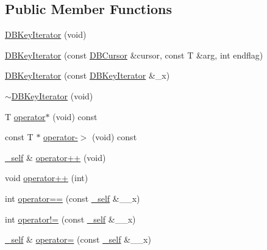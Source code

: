 \subsection*{Public Member Functions}
\begin{DoxyCompactItemize}
\item 
\mbox{\hyperlink{classFILEDB_1_1DBKeyIterator_aece085c0a59d87759e01613b5c64ef36}{D\+B\+Key\+Iterator}} (void)
\item 
\mbox{\hyperlink{classFILEDB_1_1DBKeyIterator_a7dc82bdde4a77bcadd704a3e87f6534a}{D\+B\+Key\+Iterator}} (const \mbox{\hyperlink{classFILEDB_1_1DBCursor}{D\+B\+Cursor}} \&cursor, const T \&arg, int endflag)
\item 
\mbox{\hyperlink{classFILEDB_1_1DBKeyIterator_ac1fa531110379c3deb566758095e8a0e}{D\+B\+Key\+Iterator}} (const \mbox{\hyperlink{classFILEDB_1_1DBKeyIterator}{D\+B\+Key\+Iterator}} \&\+\_\+x)
\item 
\mbox{\hyperlink{classFILEDB_1_1DBKeyIterator_a54300ef8000ed2910c47d931ee091113}{$\sim$\+D\+B\+Key\+Iterator}} (void)
\item 
T \mbox{\hyperlink{classFILEDB_1_1DBKeyIterator_ab3cfba3f2b19b6eb74ff614c62195ab4}{operator$\ast$}} (void) const
\item 
const T $\ast$ \mbox{\hyperlink{classFILEDB_1_1DBKeyIterator_a453e5281ba078f217558d44c049c564c}{operator-\/$>$}} (void) const
\item 
\mbox{\hyperlink{classFILEDB_1_1DBKeyIterator_aaf7773c7a848ec6e04bc738dd794ace1}{\+\_\+self}} \& \mbox{\hyperlink{classFILEDB_1_1DBKeyIterator_a7816155cac741f3f82dafa73028f4307}{operator++}} (void)
\item 
void \mbox{\hyperlink{classFILEDB_1_1DBKeyIterator_a364ac0414da6888e0b981f07b3239257}{operator++}} (int)
\item 
int \mbox{\hyperlink{classFILEDB_1_1DBKeyIterator_ab6d1aad1d07c4ee9a1edeadf6610c6f4}{operator==}} (const \mbox{\hyperlink{classFILEDB_1_1DBKeyIterator_aaf7773c7a848ec6e04bc738dd794ace1}{\+\_\+self}} \&\+\_\+\+\_\+x)
\item 
int \mbox{\hyperlink{classFILEDB_1_1DBKeyIterator_aa92d51bde395e8c546d9cbe1c65ef5e1}{operator!=}} (const \mbox{\hyperlink{classFILEDB_1_1DBKeyIterator_aaf7773c7a848ec6e04bc738dd794ace1}{\+\_\+self}} \&\+\_\+\+\_\+x)
\item 
\mbox{\hyperlink{classFILEDB_1_1DBKeyIterator_aaf7773c7a848ec6e04bc738dd794ace1}{\+\_\+self}} \& \mbox{\hyperlink{classFILEDB_1_1DBKeyIterator_adfa49c128d637dae0263553529126575}{operator=}} (const \mbox{\hyperlink{classFILEDB_1_1DBKeyIterator_aaf7773c7a848ec6e04bc738dd794ace1}{\+\_\+self}} \&\+\_\+\+\_\+x)

\end{DoxyCompactItemize}
